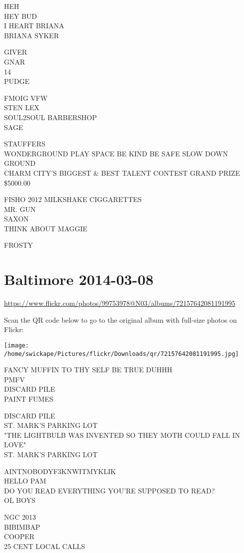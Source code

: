 \documentclass[10pt,letterpaper]{article}
\begin{document}
HEH\\
HEY BUD\\
I HEART BRIANA\\
BRIANA SYKER

GIVER\\
GNAR\\
14\\
PUDGE

FMOIG VFW\\
STEN LEX\\
SOUL2SOUL BARBERSHOP\\
SAGE

STAUFFERS\\
WONDERGROUND PLAY SPACE BE KIND BE SAFE SLOW DOWN\\
GROUND\\
CHARM CITY'S BIGGEST \& BEST TALENT CONTEST GRAND PRIZE \$5000.00

FISHO 2012 MILKSHAKE CIGGARETTES\\
MR. GUN\\
SAXON\\
THINK ABOUT MAGGIE

FROSTY


\section*{Baltimore 2014-03-08}

\url{https://www.flickr.com/photos/99753978@N03/albums/72157642081191995}

Scan the QR code below to go to the original album with full-size photos on Flickr:

\texttt{[image: /home/swickape/Pictures/flickr/Downloads/qr/72157642081191995.jpg]}


FANCY MUFFIN TO THY SELF BE TRUE DUHHH\\
PMFV\\
DISCARD PILE\\
PAINT FUMES

DISCARD PILE\\
ST. MARK'S PARKING LOT\\
"THE LIGHTBULB WAS INVENTED SO THEY MOTH COULD FALL IN LOVE"\\
ST. MARK'S PARKING LOT

AINTNOBODYF3KNWITMYKLIK\\
HELLO PAM\\
DO YOU READ EVERYTHING YOU'RE SUPPOSED TO READ?\\
OL BOYS

NGC 2013\\
BIBIMBAP\\
COOPER\\
25 CENT LOCAL CALLS
\end{document}
